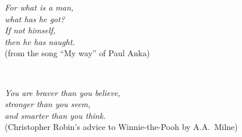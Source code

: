 \pagestyle{empty}
\vspace{2in}
\begin{flushleft}
{%
{\em For what is a man,\\
what has he got? \\
If not himself, \\
then he has naught.}\\

\bigskip
 (from the song ``My way'' of Paul Anka)
}
\end{flushleft}

\vfill{\, }

\begin{flushright}
{\em You are braver than you believe, \\
stronger than you seem, \\
and smarter than you think.}\\

\bigskip
(Christopher Robin's advice to Winnie-the-Pooh by A.A.\ Milne) 
\end{flushright}
